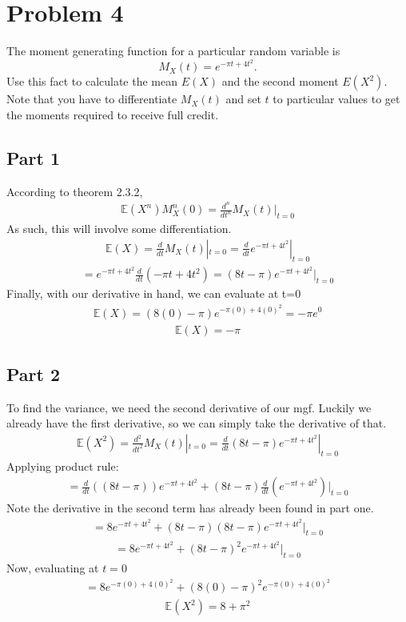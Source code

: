 \documentclass{article}
\begin{document}
\section*{Problem 4}

    The moment generating function for a particular random variable is 
    \[
    M_X(t) = e^{-\pi t + 4t^2}.
    \]
    Use this fact to calculate the mean $E(X)$ and the second moment $E(X^2)$. Note that you have to differentiate $M_X(t)$ and set $t$ to particular values to get the moments required to receive full credit.

\subsection*{Part 1}
According to theorem 2.3.2,
\begin{align*}
\mathbb{E}(X^n)M_X^{n}(0) = \frac{d^n}{dt^n}M_X(t)|_{t=0}
\end{align*}
As such, this will involve some differentiation.
\begin{align*}
\mathbb{E}(X) = \frac{d}{dt}M_X(t)|_{t=0} = \frac{d}{dt}e^{-\pi t + 4t^2} |_{t=0}
\end{align*}
\begin{align*}
 = e^{-\pi t + 4t^2} \frac{d}{dt} (-\pi t + 4t^2) = (8t-\pi) e^{-\pi t + 4t^2}|_{t=0}
\end{align*}
Finally, with our derivative in hand, we can evaluate at t=0
\begin{align*}
\mathbb{E}(X) =(8(0)-\pi) e^{-\pi (0) + 4(0)^2} = -\pi e^{0}
\end{align*}
\begin{align*}
\boxed{\mathbb{E}(X) =-\pi}
\end{align*}
\subsection*{Part 2}
To find the variance, we need the second derivative of our mgf. Luckily we already have the first derivative, so we can simply take the derivative of that.
\begin{align*}
\mathbb{E}(X^2) = \frac{d^2}{dt^2}M_X(t)|_{t=0} = \frac{d}{dt}(8t-\pi) e^{-\pi t + 4t^2}|_{t=0}
\end{align*}
Applying product rule:
\begin{align*}
 = \frac{d}{dt}((8t-\pi))e^{-\pi t + 4t^2}+(8t-\pi)\frac{d}{dt}(e^{-\pi t + 4t^2})|_{t=0}
\end{align*}
Note the derivative in the second term has already been found in part one.
\begin{align*}
 = 8e^{-\pi t + 4t^2}+(8t-\pi)(8t-\pi) e^{-\pi t + 4t^2}|_{t=0}
\end{align*}
\begin{align*}
 = 8e^{-\pi t + 4t^2}+(8t-\pi)^2 e^{-\pi t + 4t^2}|_{t=0}
\end{align*}
Now, evaluating at $t=0$
\begin{align*}
 = 8e^{-\pi (0) + 4(0)^2}+(8(0)-\pi)^2 e^{-\pi (0) + 4(0)^2}
\end{align*}
\begin{align*}
\boxed{\mathbb{E}(X^2) = 8+\pi^2}
\end{align*}
\clearpage
\end{document}
